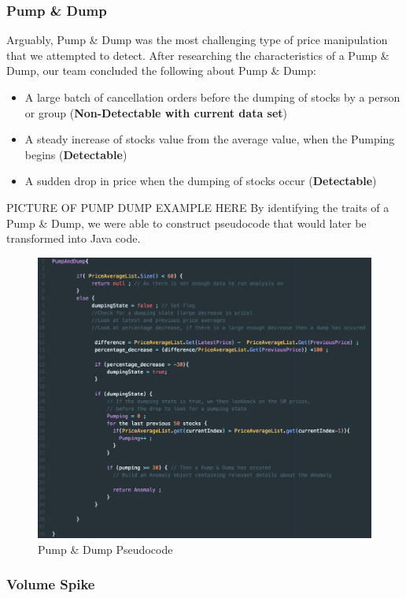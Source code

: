 \documentclass[12pt]{article}
\begin{document}
    \subsubsection{Pump \& Dump}
    Arguably, Pump \& Dump was the most challenging type of price manipulation that we attempted to detect.
    After researching the characteristics of a Pump \& Dump, our team concluded the following about Pump \& Dump:
    \begin{itemize}
      \item A large batch of cancellation orders before the dumping of stocks by a person or group (\textbf{Non-Detectable with current data set})
      \item A steady increase of stocks value from the average value, when the Pumping begins (\textbf{Detectable})
      \item A sudden drop in price when the dumping of stocks occur (\textbf{Detectable})
    \end{itemize}
    PICTURE OF PUMP DUMP EXAMPLE HERE
    By identifying the traits of a Pump \& Dump, we were able to construct pseudocode that would later be transformed
    into Java code.
    \begin{figure}[H]
    \centering
    \includegraphics[width=150mm]{PDpseudo.png}
    \caption{Pump \& Dump Pseudocode}
    \end{figure}

    \subsubsection{Volume Spike}
\end{document}
